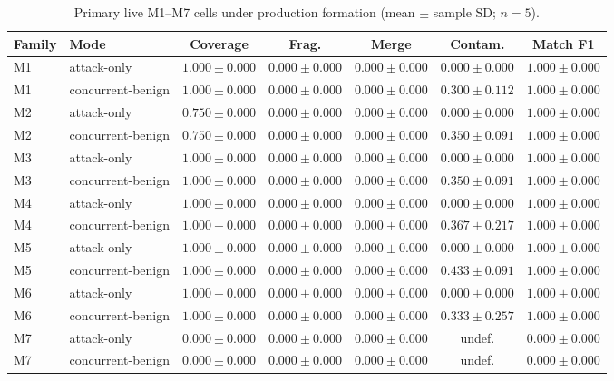 \begin{table}[!t]
\caption{Primary live M1--M7 cells under production formation (mean $\pm$ sample SD; $n=5$).}
\label{tab:table4-amended-results}
\centering
\scriptsize
\setlength{\tabcolsep}{4pt}
\begin{tabular}{@{}llccccc@{}}
\toprule
\textbf{Family} & \textbf{Mode} & \textbf{Coverage} & \textbf{Frag.} & \textbf{Merge} & \textbf{Contam.} & \textbf{Match F1} \\
\midrule
M1 & attack-only & $1.000\pm0.000$ & $0.000\pm0.000$ & $0.000\pm0.000$ & $0.000\pm0.000$ & $1.000\pm0.000$ \\
M1 & concurrent-benign & $1.000\pm0.000$ & $0.000\pm0.000$ & $0.000\pm0.000$ & $0.300\pm0.112$ & $1.000\pm0.000$ \\
M2 & attack-only & $0.750\pm0.000$ & $0.000\pm0.000$ & $0.000\pm0.000$ & $0.000\pm0.000$ & $1.000\pm0.000$ \\
M2 & concurrent-benign & $0.750\pm0.000$ & $0.000\pm0.000$ & $0.000\pm0.000$ & $0.350\pm0.091$ & $1.000\pm0.000$ \\
M3 & attack-only & $1.000\pm0.000$ & $0.000\pm0.000$ & $0.000\pm0.000$ & $0.000\pm0.000$ & $1.000\pm0.000$ \\
M3 & concurrent-benign & $1.000\pm0.000$ & $0.000\pm0.000$ & $0.000\pm0.000$ & $0.350\pm0.091$ & $1.000\pm0.000$ \\
M4 & attack-only & $1.000\pm0.000$ & $0.000\pm0.000$ & $0.000\pm0.000$ & $0.000\pm0.000$ & $1.000\pm0.000$ \\
M4 & concurrent-benign & $1.000\pm0.000$ & $0.000\pm0.000$ & $0.000\pm0.000$ & $0.367\pm0.217$ & $1.000\pm0.000$ \\
M5 & attack-only & $1.000\pm0.000$ & $0.000\pm0.000$ & $0.000\pm0.000$ & $0.000\pm0.000$ & $1.000\pm0.000$ \\
M5 & concurrent-benign & $1.000\pm0.000$ & $0.000\pm0.000$ & $0.000\pm0.000$ & $0.433\pm0.091$ & $1.000\pm0.000$ \\
M6 & attack-only & $1.000\pm0.000$ & $0.000\pm0.000$ & $0.000\pm0.000$ & $0.000\pm0.000$ & $1.000\pm0.000$ \\
M6 & concurrent-benign & $1.000\pm0.000$ & $0.000\pm0.000$ & $0.000\pm0.000$ & $0.333\pm0.257$ & $1.000\pm0.000$ \\
M7 & attack-only & $0.000\pm0.000$ & $0.000\pm0.000$ & $0.000\pm0.000$ & undef. & $0.000\pm0.000$ \\
M7 & concurrent-benign & $0.000\pm0.000$ & $0.000\pm0.000$ & $0.000\pm0.000$ & undef. & $0.000\pm0.000$ \\
\bottomrule
\end{tabular}
\end{table}

